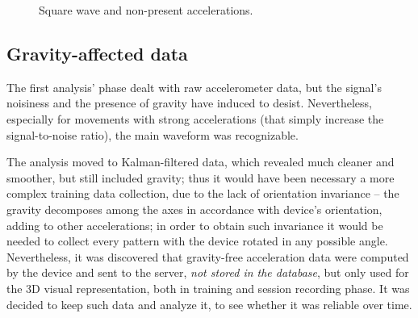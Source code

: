\begin{center}
	\begin{figure}[ht!]
		\caption{Square wave and non-present accelerations.}
	\end{figure}
\end{center}

\subsection{Gravity-affected data}
The first analysis' phase dealt with raw accelerometer data, but the signal's noisiness and the presence of gravity have induced to desist. Nevertheless, especially for movements with strong accelerations (that simply increase the signal-to-noise ratio), the main waveform was recognizable.
\bigbreak

The analysis moved to Kalman-filtered data, which revealed much cleaner and smoother, but still included gravity; thus it would have been necessary a more complex training data collection, due to the lack of orientation invariance – the gravity decomposes among the axes in accordance with device's orientation, adding to other accelerations; in order to obtain such invariance it would be needed to collect every pattern with the device rotated in any possible angle.\\
Nevertheless, it was discovered that gravity-free acceleration data were computed by the device and sent to the server, \textit{not stored in the database}, but only used for the 3D visual representation, both in training and session recording phase. It was decided to keep such data and analyze it, to see whether it was reliable over time.
\bigbreak

